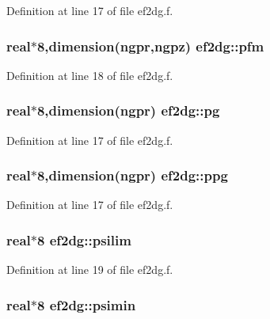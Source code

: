 Definition at line 17 of file ef2dg.f.\hypertarget{namespaceef2dg_04b90c623a3316539f8336b49bc8c3b7}{
\subsubsection[pfm]{\setlength{\rightskip}{0pt plus 5cm}real$\ast$8,dimension(ngpr,ngpz) {\bf ef2dg::pfm}}}
\label{namespaceef2dg_04b90c623a3316539f8336b49bc8c3b7}




Definition at line 18 of file ef2dg.f.\hypertarget{namespaceef2dg_507db5a901c6ff6e8b80ace4211efd3d}{
\subsubsection[pg]{\setlength{\rightskip}{0pt plus 5cm}real$\ast$8,dimension(ngpr) {\bf ef2dg::pg}}}
\label{namespaceef2dg_507db5a901c6ff6e8b80ace4211efd3d}




Definition at line 17 of file ef2dg.f.\hypertarget{namespaceef2dg_b55b4db9b403180fe2861c7cd43c98c8}{
\subsubsection[ppg]{\setlength{\rightskip}{0pt plus 5cm}real$\ast$8,dimension(ngpr) {\bf ef2dg::ppg}}}
\label{namespaceef2dg_b55b4db9b403180fe2861c7cd43c98c8}




Definition at line 17 of file ef2dg.f.\hypertarget{namespaceef2dg_11687c59dc99e16fd6d50fabc43ee8d9}{
\subsubsection[psilim]{\setlength{\rightskip}{0pt plus 5cm}real$\ast$8 {\bf ef2dg::psilim}}}
\label{namespaceef2dg_11687c59dc99e16fd6d50fabc43ee8d9}




Definition at line 19 of file ef2dg.f.\hypertarget{namespaceef2dg_c809d7b04339100feba4f34562cc7305}{
\subsubsection[psimin]{\setlength{\rightskip}{0pt plus 5cm}real$\ast$8 {\bf ef2dg::psimin}}}
\label{namespaceef2dg_c809d7b04339100feba4f34562cc7305}




